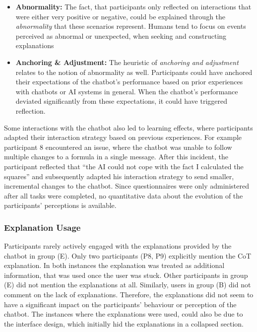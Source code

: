 \begin{itemize}
    \item \textbf{Abnormality:} The fact, that participants only reflected on interactions that were either very positive or negative, could be explained through the \textit{abnormality} that these scenarios represent. Humans tend to focus on events perceived as abnormal or unexpected, when seeking and constructing explanations \parencite{Miller2019}
    \item \textbf{Anchoring \& Adjustment:} The heuristic of \textit{anchoring and adjustment} \parencite{Tversky1974} relates to the notion of abnormality as well. Participants could have anchored their expectations of the chatbot's performance based on prior experiences with chatbots or AI systems in general. When the chatbot's performance deviated significantly from these expectations, it could have triggered reflection.
\end{itemize}

Some interactions with the chatbot also led to learning effects, where participants adapted their interaction strategy based on previous experiences. For example participant 8 encountered an issue, where the chatbot was unable to follow multiple changes to a formula in a single message. After this incident, the participant reflected that “the AI could not cope with the fact I calculated the squares” and subsequently adapted his interaction strategy to send smaller, incremental changes to the chatbot. Since questionnaires were only administered after all tasks were completed, no quantitative data about the evolution of the participants' perceptions is available.

\subsubsection{Explanation Usage} \label{sssec:explanation_usage}

Participants rarely actively engaged with the explanations provided by the chatbot in group (E). Only two participants (P8, P9) explicitly mention the \ac{CoT} explanation. In both instances the explanation was treated as additional information, that was used once the user was stuck. Other participants in group (E) did not mention the explanations at all. Similarly, users in group (B) did not comment on the lack of explanations. Therefore, the explanations did not seem to have a significant impact on the participants' behaviour or perception of the chatbot. The instances where the explanations were used, could also be due to the interface design, which initially hid the explanations in a collapsed section.

